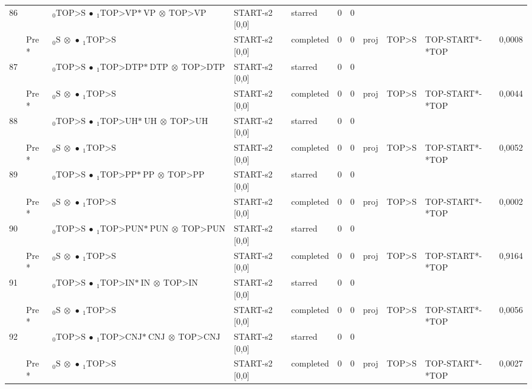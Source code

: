 \documentclass[10pt]{article}
\begin{document}
\begin{longtable}[htbp]{lllllllllll}
86 & & $ {}_0 \textrm{TOP>S} \  \bullet \ {}_{1} \textrm{TOP>VP*} \ \textrm{VP} \  \otimes \ \textrm{TOP>VP} $ & START-s2 [0,0] & starred & 0 & 0 & & & & \\ 
 & Pre *& $ {}_0 \textrm{S} \  \otimes \  \bullet \ {}_{1} \textrm{TOP>S} $ & START-s2 [0,0] & completed & 0 & 0 & proj & TOP>S & TOP-START*-*TOP & 0,0008 \\ 
87 & & $ {}_0 \textrm{TOP>S} \  \bullet \ {}_{1} \textrm{TOP>DTP*} \ \textrm{DTP} \  \otimes \ \textrm{TOP>DTP} $ & START-s2 [0,0] & starred & 0 & 0 & & & & \\ 
 & Pre *& $ {}_0 \textrm{S} \  \otimes \  \bullet \ {}_{1} \textrm{TOP>S} $ & START-s2 [0,0] & completed & 0 & 0 & proj & TOP>S & TOP-START*-*TOP & 0,0044 \\ 
88 & & $ {}_0 \textrm{TOP>S} \  \bullet \ {}_{1} \textrm{TOP>UH*} \ \textrm{UH} \  \otimes \ \textrm{TOP>UH} $ & START-s2 [0,0] & starred & 0 & 0 & & & & \\ 
 & Pre *& $ {}_0 \textrm{S} \  \otimes \  \bullet \ {}_{1} \textrm{TOP>S} $ & START-s2 [0,0] & completed & 0 & 0 & proj & TOP>S & TOP-START*-*TOP & 0,0052 \\ 
89 & & $ {}_0 \textrm{TOP>S} \  \bullet \ {}_{1} \textrm{TOP>PP*} \ \textrm{PP} \  \otimes \ \textrm{TOP>PP} $ & START-s2 [0,0] & starred & 0 & 0 & & & & \\ 
 & Pre *& $ {}_0 \textrm{S} \  \otimes \  \bullet \ {}_{1} \textrm{TOP>S} $ & START-s2 [0,0] & completed & 0 & 0 & proj & TOP>S & TOP-START*-*TOP & 0,0002 \\ 
90 & & $ {}_0 \textrm{TOP>S} \  \bullet \ {}_{1} \textrm{TOP>PUN*} \ \textrm{PUN} \  \otimes \ \textrm{TOP>PUN} $ & START-s2 [0,0] & starred & 0 & 0 & & & & \\ 
 & Pre *& $ {}_0 \textrm{S} \  \otimes \  \bullet \ {}_{1} \textrm{TOP>S} $ & START-s2 [0,0] & completed & 0 & 0 & proj & TOP>S & TOP-START*-*TOP & 0,9164 \\ 
91 & & $ {}_0 \textrm{TOP>S} \  \bullet \ {}_{1} \textrm{TOP>IN*} \ \textrm{IN} \  \otimes \ \textrm{TOP>IN} $ & START-s2 [0,0] & starred & 0 & 0 & & & & \\ 
 & Pre *& $ {}_0 \textrm{S} \  \otimes \  \bullet \ {}_{1} \textrm{TOP>S} $ & START-s2 [0,0] & completed & 0 & 0 & proj & TOP>S & TOP-START*-*TOP & 0,0056 \\ 
92 & & $ {}_0 \textrm{TOP>S} \  \bullet \ {}_{1} \textrm{TOP>CNJ*} \ \textrm{CNJ} \  \otimes \ \textrm{TOP>CNJ} $ & START-s2 [0,0] & starred & 0 & 0 & & & & \\ 
 & Pre *& $ {}_0 \textrm{S} \  \otimes \  \bullet \ {}_{1} \textrm{TOP>S} $ & START-s2 [0,0] & completed & 0 & 0 & proj & TOP>S & TOP-START*-*TOP & 0,0027 \\ 

\end{longtable}
\end{document}
